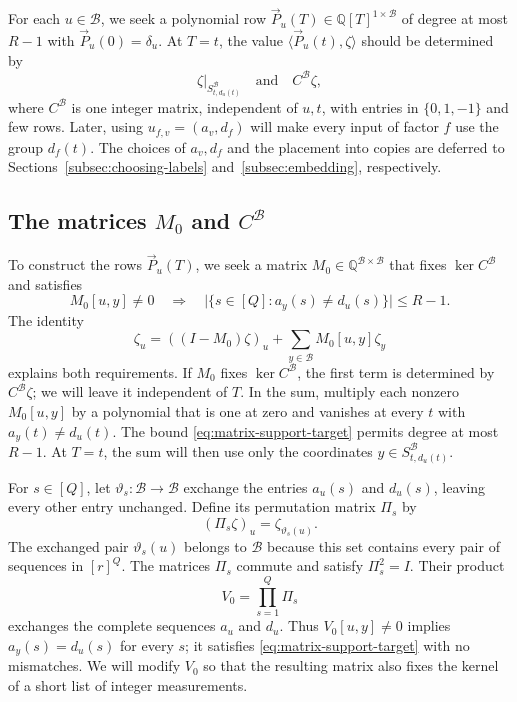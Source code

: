 \documentclass[11pt,reqno]{amsart}
\numberwithin{equation}{section}
\theoremstyle{definition}\newtheorem{definition}[theorem]{Definition}
\theoremstyle{remark}\newtheorem{remark}[theorem]{Remark}
\renewcommand{\le}{\leqslant}
\begin{document}
For each $u\in\mathcal B$, we seek a polynomial row
$\vec{P}_u(T)\in\mathbb Q[T]^{1\times\mathcal B}$ of degree at most $R-1$
with $\vec{P}_u(0)=\delta_u$. At $T=t$, the value $\langle \vec{P}_u(t), \zeta\rangle$ should be
determined by
\[
 \zeta|_{S^{\mathcal B}_{t,d_u(t)}}
 \quad\text{and}\quad C^{\mathcal B}\zeta,
\]
where $C^{\mathcal B}$ is one integer matrix, independent of $u,t$,
with entries in $\{0,1,-1\}$ and few rows. Later, using
$u_{f,v}=(a_v,d_f)$ will make every input of factor $f$ use the group
$d_f(t)$. The choices of $a_v,d_f$ and the placement into copies are
deferred to Sections~\ref{subsec:choosing-labels}
and~\ref{subsec:embedding}, respectively.

\subsection{The matrices $M_0$ and $C^{\mathcal B}$}
To construct the rows $\vec{P}_u(T)$, we seek a matrix
$M_0\in\mathbb Q^{\mathcal B\times\mathcal B}$ that fixes
$\ker C^{\mathcal B}$ and satisfies
\begin{equation}\label{eq:matrix-support-target}
 M_0[u,y]\ne0\quad\Longrightarrow\quad
 \bigl|\{s\in[Q]:a_y(s)\ne d_u(s)\}\bigr|\le R-1.
\end{equation}
The identity
\begin{equation}\label{eq:coordinate-decomposition}
 \zeta_u=((I-M_0)\zeta)_u+
          \sum_{y\in\mathcal B}M_0[u,y]\zeta_y
\end{equation}
explains both requirements. If $M_0$ fixes $\ker C^{\mathcal B}$,
the first term is determined by $C^{\mathcal B}\zeta$; we will leave
it independent of $T$. In the sum, multiply each nonzero
$M_0[u,y]$ by a polynomial that is one at zero and vanishes at every
$t$ with $a_y(t)\ne d_u(t)$. The bound
\eqref{eq:matrix-support-target} permits degree at most $R-1$.
At $T=t$, the sum will then use only the coordinates
$y\in S^{\mathcal B}_{t,d_u(t)}$.

For $s\in[Q]$, let $\vartheta_s:\mathcal B\to\mathcal B$ exchange the
entries $a_u(s)$ and $d_u(s)$, leaving every other entry unchanged.
Define its permutation matrix $\Pi_s$ by
\[
 (\Pi_s\zeta)_u=\zeta_{\vartheta_s(u)}.
\]
The exchanged pair $\vartheta_s(u)$ belongs to $\mathcal B$ because this set
contains every pair of sequences in $[r]^Q$. The matrices $\Pi_s$
commute and satisfy $\Pi_s^2=I$. Their product
\[
 V_0=\prod_{s=1}^Q\Pi_s
\]
exchanges the complete sequences $a_u$ and $d_u$. Thus
$V_0[u,y]\ne0$ implies $a_y(s)=d_u(s)$ for every $s$; it satisfies
\eqref{eq:matrix-support-target} with no mismatches. We will modify
$V_0$ so that the resulting matrix also fixes the kernel of a short
list of integer measurements.
\end{document}
